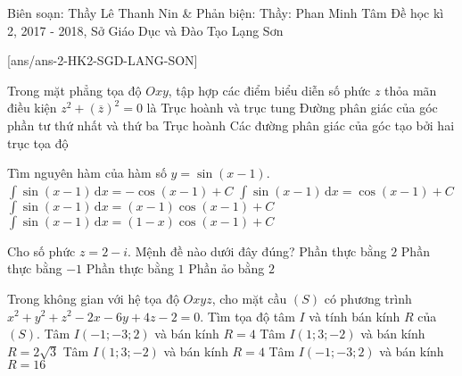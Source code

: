 \begin{name}
{Biên soạn: Thầy Lê Thanh Nin \& Phản biện: Thầy: Phan Minh Tâm}
{Đề học kì 2, 2017 - 2018, Sở Giáo Dục và Đào Tạo Lạng Sơn}
\end{name}
\setcounter{ex}{0}
[ans/ans-2-HK2-SGD-LANG-SON]

\begin{ex}%
	Trong mặt phẳng tọa độ $Oxy$, tập hợp các điểm biểu diễn số phức $z$ thỏa mãn điều kiện $z^2+(\overline{z})^2=0$ là
	\choice
	{Trục hoành và trục tung}
	{Đường phân giác của góc phần tư thứ nhất và thứ ba}
	{Trục hoành}
	{\True Các đường phân giác của góc tạo bởi hai trục tọa độ}
\end{ex}

\begin{ex}%
	Tìm nguyên hàm của hàm số $y=\sin(x-1)$.
	\choice
	{\True $\displaystyle\int \sin(x-1)\mathrm{\,d}x=-\cos(x-1)+C$}
	{ $\displaystyle\int \sin(x-1)\mathrm{\,d}x=\cos(x-1)+C$}
	{ $\displaystyle\int \sin(x-1)\mathrm{\,d}x=(x-1)\cos(x-1)+C$}
	{ $\displaystyle\int \sin(x-1)\mathrm{\,d}x=(1-x)\cos(x-1)+C$}
\end{ex}

\begin{ex}%
	Cho số phức $z=2-i$. Mệnh đề nào dưới đây đúng?
	\choice
	{\True Phần thực bằng $2$}
	{Phần thực bằng $-1$}
	{Phần thực bằng $1$}
	{Phần ảo bằng $2$}
\end{ex}

\begin{ex}%
	Trong không gian với hệ tọa độ $Oxyz$, cho mặt cầu $(S)$ có phương trình $x^2+y^2+z^2-2x-6y+4z-2=0$. Tìm tọa độ tâm $I$ và tính bán kính $R$ của $(S)$.
	\choice
	{Tâm $I(-1; -3; 2)$ và bán kính $R=4$}
	{Tâm $I(1; 3; -2)$ và bán kính $R=2\sqrt{3}$}
	{\True Tâm $I(1; 3; -2)$ và bán kính $R=4$}
	{Tâm $I(-1; -3; 2)$ và bán kính $R=16$}
\end{ex}

